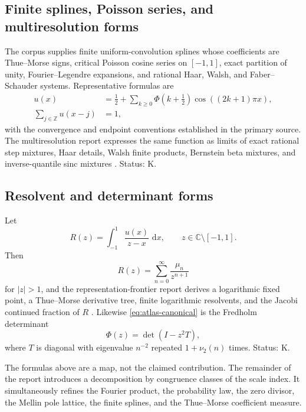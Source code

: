 \documentclass[11pt,oneside]{article}
\numberwithin{equation}{section}
\theoremstyle{definition}
\theoremstyle{remark}
\newcommand{\C}{\mathbb C}
\newcommand{\Z}{\mathbb Z}
\newcommand{\vtwo}{\nu_2}
\newcommand{\dd}{\,\mathrm d}
\newcommand{\statusknown}{\textcolor{deepviolet}{\textsf{K}}}
\begin{document}
\subsection{Finite splines, Poisson series, and multiresolution forms}

The corpus supplies finite uniform-convolution splines whose coefficients are
Thue--Morse signs, critical Poisson cosine series on $[-1,1]$, exact partition
of unity, Fourier--Legendre expansions, and rational Haar, Walsh, and
Faber--Schauder systems.  Representative formulas are
\begin{align}
 u(x)&=\frac12+\sum_{k\ge0}\Phi(k+\tfrac12)
                 \cos((2k+1)\pi x),                       \label{eq:critical-cosine}\\
 \sum_{j\in\Z}u(x-j)&=1,                                  \label{eq:partition-unity}
\end{align}
with the convergence and endpoint conventions established in the primary
source.  The multiresolution report expresses the same function as limits of
exact rational step mixtures, Haar details, Walsh finite products, Bernstein
beta mixtures, and inverse-quantile sinc mixtures \cite{repoMultiresolution}.
Status: \statusknown.

\subsection{Resolvent and determinant forms}

Let
\begin{equation}
 R(z)=\int_{-1}^{1}\frac{u(x)}{z-x}\,\dd x,
 \qquad z\in\C\setminus[-1,1].                             \label{eq:Cauchy-transform}
\end{equation}
Then
\begin{equation}
 R(z)=\sum_{n=0}^{\infty}\frac{\mu_n}{z^{n+1}}             \label{eq:R-moment-series}
\end{equation}
for $|z|>1$, and the representation-frontier report derives a logarithmic
fixed point, a Thue--Morse derivative tree, finite logarithmic resolvents, and
the Jacobi continued fraction of $R$ \cite{repoRepresentations}.  Likewise
\eqref{eq:atlas-canonical} is the Fredholm determinant
\begin{equation}
 \Phi(z)=\det(I-z^2T),                                     \label{eq:Fredholm}
\end{equation}
where $T$ is diagonal with eigenvalue $n^{-2}$ repeated $1+\vtwo(n)$ times.
Status: \statusknown.

\begin{statusbox}[Transition]
The formulas above are a map, not the claimed contribution.  The remainder of
the report introduces a decomposition by congruence classes of the scale index.
It simultaneously refines the Fourier product, the probability law, the zero
divisor, the Mellin pole lattice, the finite splines, and the Thue--Morse
coefficient measure.
\end{statusbox}
\end{document}
